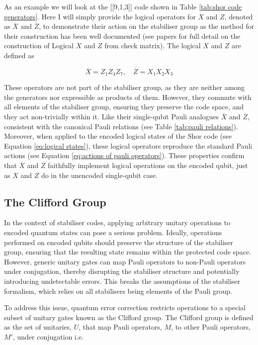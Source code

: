 As an example we will look at the [[9,1,3]] code shown in Table \ref{tab:shor code generators}. Here I will simply provide the logical operators for \(X\) and \(Z\), denoted as \(\overline{X}\) and \(\overline{Z}\), to demonstrate their action on the stabiliser group as the method for their construction has been well documented (see papers \cite{webster2024engineeringquantumerrorcorrection} \cite{cdi_askewsholts_vlebooks_9780511985249} for full detail on the construction of Logical \(X\) and \(Z\) from check matrix). The logical \(X\) and \(Z\) are defined as

\begin{equation}
    \overline{X}=Z_1Z_4Z_7, \quad \overline{Z}=X_1X_2X_3
\end{equation}

These operators are not part of the stabiliser group, as they are neither among the generators nor expressible as products of them. However, they commute with all elements of the stabiliser group, ensuring they preserve the code space, and they act non-trivially within it. Like their single-qubit Pauli analogues \(\overline{X}\) and \(\overline{Z}\), consistent with the canonical Pauli relations (see Table \ref{tab:pauli relations}). Moreover, when applied to the encoded logical states of the Shor code (see Equation \ref{eq:logical states}), these logical operators reproduce the standard Pauli actions (see Equation \ref{eq:actions of pauli operators}). These properties confirm that \(\overline{X}\) and \(\overline{Z}\) faithfully implement logical operations on the encoded qubit, just as \(X\) and \(Z\) do in the unencoded single-qubit case.

\subsection{The Clifford Group}
In the context of stabiliser codes, applying arbitrary unitary operations to encoded quantum states can pose a serious problem. Ideally, operations performed on encoded qubits should preserve the structure of the stabiliser group, ensuring that the resulting state remains within the protected code space. However, generic unitary gates can map Pauli operators to non-Pauli operators under conjugation, thereby disrupting the stabiliser structure and potentially introducing undetectable errors. This breaks the assumptions of the stabiliser formalism, which relies on all stabilisers being elements of the Pauli group.

To address this issue, quantum error correction restricts operations to a special subset of unitary gates known as the Clifford group. The Clifford group is defined as the set of unitaries, \(U\), that map Pauli operators, \(M\), to other Pauli operators, \(M'\), under conjugation \cite{gottesman2016surviving} i.e.

